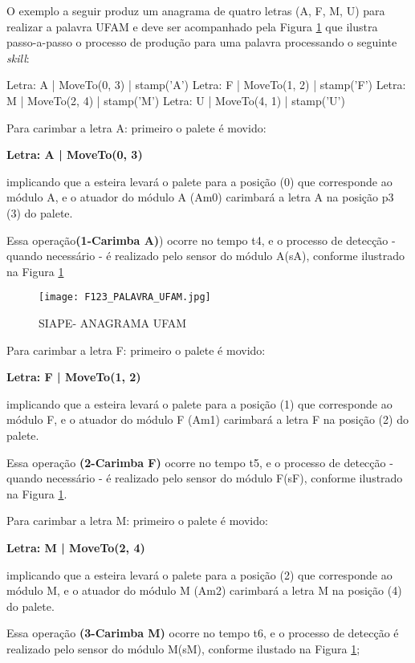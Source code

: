O exemplo a seguir produz um anagrama de quatro letras (A, F, M, U) para realizar a palavra UFAM e deve ser acompanhado pela Figura \ref{F123} que ilustra passo-a-passo o processo de produção para uma palavra processando o seguinte \textit{skill}: 
		
		Letra: A | MoveTo(0, 3) | stamp('A')
		Letra: F | MoveTo(1, 2) | stamp('F')
		Letra: M | MoveTo(2, 4) | stamp('M')
		Letra: U | MoveTo(4, 1) | stamp('U')
		
Para carimbar a letra A:  primeiro o palete é movido:
\begin{center}
	\textbf{Letra: A | MoveTo(0, 3)}
\end{center}
implicando que a esteira levará o palete para a posição (0) que corresponde ao módulo A, e o atuador do módulo A (Am0) carimbará a letra A na posição p3 (3) do palete. 

Essa operação\textbf{(1-Carimba A)}) ocorre no tempo t4, e o processo de detecção - quando necessário - é realizado pelo sensor do módulo A(sA), conforme ilustrado na Figura \ref{F123}

	\begin{figure}[!h]
		\centering
		\texttt{[image: F123\_PALAVRA\_UFAM.jpg]} 
		\caption{SIAPE- ANAGRAMA UFAM}
		\label{F123}
	\end{figure}

Para carimbar a letra F:  primeiro o palete é movido:
\begin{center}
	\textbf{Letra: F | MoveTo(1, 2)}
\end{center}
implicando que a esteira levará o palete para a posição (1) que corresponde ao módulo F, e o atuador do módulo F (Am1) carimbará a letra F na posição (2) do palete. 

Essa operação \textbf{(2-Carimba F)} ocorre no tempo t5, e o processo de detecção - quando necessário - é realizado pelo sensor do módulo F(sF), conforme ilustrado na Figura \ref{F123}.


Para carimbar a letra M: primeiro o palete é movido:
\begin{center}
	\textbf{Letra: M | MoveTo(2, 4)}
\end{center}
implicando que a esteira levará o palete para a posição (2) que corresponde ao módulo M, e o atuador do módulo M (Am2) carimbará a letra M na posição (4) do palete. 

Essa operação \textbf{(3-Carimba M)} ocorre no tempo t6, e o processo de detecção é realizado pelo sensor do módulo M(sM), conforme ilustado na Figura \ref{F123}; 

